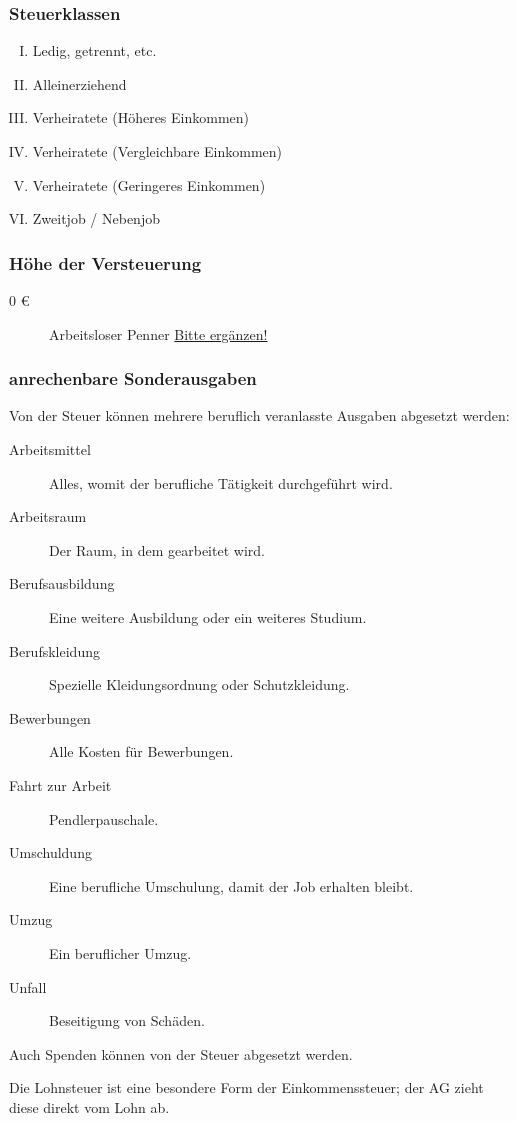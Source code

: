 \documentclass{scrartcl}
\begin{document}
\subsubsection{Steuerklassen}

\begin{enumerate}[I.]
	\item Ledig, getrennt, etc.
	\item Alleinerziehend
	\item Verheiratete (Höheres Einkommen)
	\item Verheiratete (Vergleichbare Einkommen)
	\item Verheiratete (Geringeres Einkommen)
	\item Zweitjob / Nebenjob
\end{enumerate}

\subsubsection{Höhe der Versteuerung}

\begin{description}
	\item [0 \euro] Arbeitsloser Penner \underline{Bitte ergänzen!}
\end{description}

\subsubsection{anrechenbare Sonderausgaben}

\noindent
Von der Steuer können mehrere beruflich veranlasste Ausgaben abgesetzt werden:

\begin{description}
	\item [Arbeitsmittel] Alles, womit der berufliche Tätigkeit durchgeführt wird.
	\item [Arbeitsraum] Der Raum, in dem gearbeitet wird.
	\item [Berufsausbildung] Eine weitere Ausbildung oder ein weiteres Studium.
	\item [Berufskleidung] Spezielle Kleidungsordnung oder Schutzkleidung.
	\item [Bewerbungen] Alle Kosten für Bewerbungen.
	\item [Fahrt zur Arbeit] Pendlerpauschale.
	\item [Umschuldung] Eine berufliche Umschulung, damit der Job erhalten bleibt.
	\item [Umzug] Ein beruflicher Umzug.
	\item [Unfall] Beseitigung von Schäden.
\end{description}

Auch Spenden können von der Steuer abgesetzt werden.

Die Lohnsteuer ist eine besondere Form der Einkommenssteuer; der AG zieht diese direkt vom Lohn ab.
\end{document}
